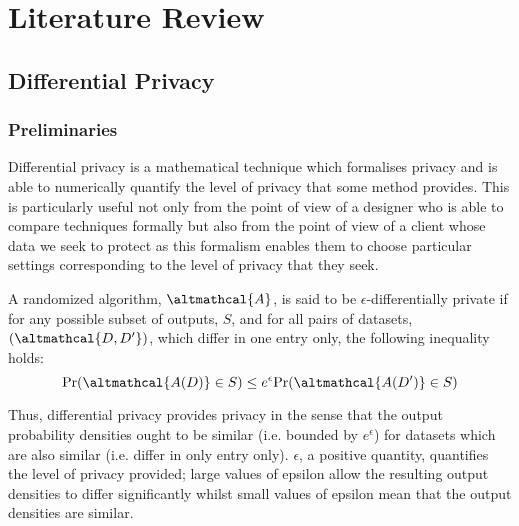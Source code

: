 
\chapter{Literature Review}
%
\graphicspath{{LitReview/Figs/}}

\section{Differential Privacy}
\subsection{Preliminaries}
Differential privacy is a mathematical technique which formalises privacy and is able to numerically quantify the level of privacy that some method provides. This is particularly useful not only from the point of view of a designer who is able to compare techniques formally but also from the point of view of a client whose data we seek to protect as this formalism enables them to choose particular settings corresponding to the level of privacy that they seek. 


\begin{definition}
	A randomized algorithm, $\altmathcal{A}$, is said to be $\epsilon$-differentially private if for any possible subset of outputs, $S$, and for all pairs of datasets, $(\altmathcal{D, D'})$, which differ in one entry only, the following inequality holds:
	\begin{equation}
	\text{Pr}(\altmathcal{A(D)} \in S) \leq e^\epsilon \text{Pr}(\altmathcal{A(D')} \in S) 
	\end{equation}
\end{definition}

Thus, differential privacy provides privacy in the sense that the output probability densities ought to be similar (i.e. bounded by $e^{\epsilon}$) for datasets which are also similar (i.e. differ in only entry only). $\epsilon$, a positive quantity, quantifies the level of privacy provided; large values of epsilon allow the resulting output densities to differ significantly whilst small values of epsilon mean that the output densities are similar. \cite{foundations}   

